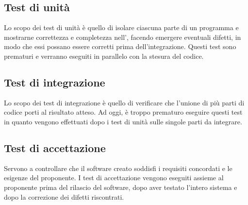 \subsection{Test di unità}
Lo scopo dei test di unità è quello di isolare ciascuna parte di un programma e mostrarne correttezza e completezza nell', facendo emergere eventuali difetti, in modo che essi possano essere corretti prima dell'integrazione. Questi test sono prematuri e verranno eseguiti in parallelo con la stesura del codice.
\subsection{Test di integrazione}
Lo scopo dei test di integrazione è quello di verificare che l'unione di più parti di codice porti al risultato atteso. Ad oggi, è troppo prematuro eseguire questi test in quanto vengono effettuati dopo i test di unità sulle singole parti da integrare.
\subsection{Test di accettazione}
Servono a controllare che il software creato soddisfi i requisiti concordati e le esigenze del proponente. I test di accettazione vengono eseguiti assieme al proponente prima del rilascio del software, dopo aver testato l’intero sistema e dopo la correzione dei difetti riscontrati.